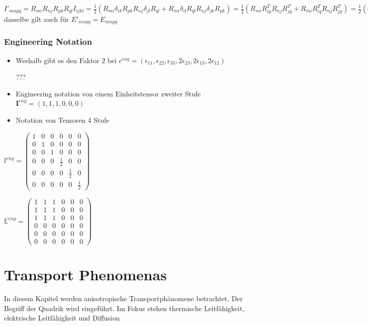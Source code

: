 \documentclass[a4paper]{scrartcl}
\begin{document}
$ I'_{mnpq}=R_{mi}R_{nj}R_{pk}R_{ql}I_{ijkl} = \frac{1}{2}(R_{mi}\delta_{ik}R_{pk}R_{nj}\delta_{jl}R_{ql} + R_{mi}\delta_{il}R_{ql}R_{nj}\delta_{jk}R_{pk})= \frac{1}{2}(R_{mi}R^T_{ip}R_{nj}R^T_{jq}+R_{mi}R^T_{iq}R_{nj}R^T_{jp})= \frac{1}{2}(\delta_{mp}\delta_{mq}\delta_{np})=I_{mnpq} $ dasselbe gilt auch für $ E'_{mnpq}=E_{mnpq}$


\subsubsection{Engineering Notation}
\begin{itemize}
\item Weshalb gibt es den Faktor 2 bei $ \epsilon^{eng}=(\epsilon_{11},\epsilon_{22},\epsilon_{33},2\epsilon_{23},2\epsilon_{13},2\epsilon_{12}) $

???


\item Engineering notation von einem Einheitstensor zweiter Stufe
$ \textbf{I}^{eng}=(1,1,1,0,0,0) $


\item Notation von Tensoren 4 Stufe

\end{itemize}
$ \mathbb{I}^{eng}=
\begin{pmatrix}
1 & 0 & 0 & 0 & 0 & 0 \\ 
0 & 1 & 0 & 0 & 0 & 0 \\ 
0 & 0 & 1 & 0 & 0 & 0 \\ 
0 & 0 & 0 & \frac{1}{2} & 0 & 0 \\ 
0 & 0 & 0 & 0 & \frac{1}{2} & 0 \\ 
0 & 0 & 0 & 0 & 0 & \frac{1}{2}
\end{pmatrix} 
$

$
\mathbb{E}^{eng}=
\begin{pmatrix}
1 & 1 & 1 & 0 & 0 & 0 \\ 
1 & 1 & 1 & 0 & 0 & 0 \\ 
1 & 1 & 1 & 0 & 0 & 0 \\ 
0 & 0 & 0 & 0 & 0 & 0 \\ 
0 & 0 & 0 & 0 & 0 & 0 \\ 
0 & 0 & 0 & 0 & 0 & 0
\end{pmatrix} 
$

\section{Transport Phenomenas}
In diesem Kapitel werden anisotropische Transportphänomene betrachtet. Der
Begriff der Quadrik wird eingeführt. Im Fokus stehen thermische Leitfähigkeit,
elektrische Leitfähigkeit und Diffusion
\end{document}
